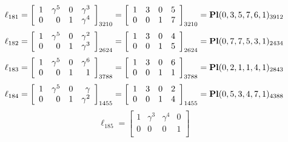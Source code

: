 \documentclass{article}
\begin{document}
{$$
\ell_{181} = 
\left[
\begin{array}{*{4}{r}}
1 & \gamma^{5} & 0 & \gamma^{3}\\
0 & 0 & 1 & \gamma^{4}\\
\end{array}
\right]
_{3210}
=
\left[
\begin{array}{*{4}c}
1  & 3  & 0  & 5\\
0  & 0  & 1  & 7\\
\end{array}
\right]_{3210}
={\rm\bf Pl}(0,3,5,7,6,1 )_{3912}$$
$$
\ell_{182} = 
\left[
\begin{array}{*{4}{r}}
1 & \gamma^{5} & 0 & \gamma^{2}\\
0 & 0 & 1 & \gamma^{3}\\
\end{array}
\right]
_{2624}
=
\left[
\begin{array}{*{4}c}
1  & 3  & 0  & 4\\
0  & 0  & 1  & 5\\
\end{array}
\right]_{2624}
={\rm\bf Pl}(0,7,7,5,3,1 )_{2434}$$
$$
\ell_{183} = 
\left[
\begin{array}{*{4}{r}}
1 & \gamma^{5} & 0 & \gamma^{6}\\
0 & 0 & 1 & 1\\
\end{array}
\right]
_{3788}
=
\left[
\begin{array}{*{4}c}
1  & 3  & 0  & 6\\
0  & 0  & 1  & 1\\
\end{array}
\right]_{3788}
={\rm\bf Pl}(0,2,1,1,4,1 )_{2843}$$
$$
\ell_{184} = 
\left[
\begin{array}{*{4}{r}}
1 & \gamma^{5} & 0 & \gamma \\
0 & 0 & 1 & \gamma^{2}\\
\end{array}
\right]
_{1455}
=
\left[
\begin{array}{*{4}c}
1  & 3  & 0  & 2\\
0  & 0  & 1  & 4\\
\end{array}
\right]_{1455}
={\rm\bf Pl}(0,5,3,4,7,1 )_{4388}$$
$$
\ell_{185} = 
\left[
\begin{array}{*{4}{r}}
1 & \gamma^{3} & \gamma^{4} & 0\\
0 & 0 & 0 & 1\\
\end{array}
\right]
$$}
\end{document}
